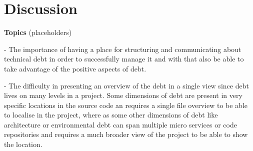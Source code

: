 

\section{Discussion}

\textbf{Topics} (placeholders)

- The importance of having a place for structuring and communicating about technical debt in order to successfully manage it and with that also be able to take advantage of the positive aspects of debt.

- The difficulty in presenting an overview of the debt in a single view since debt lives on many levels in a project. Some dimensions of debt are present in very specific locations in the source code an requires a single file overview to be able to localise in the project, where as some other dimensions of debt like architecture or environmental debt can span multiple micro services or code repositories and requires a much broader view of the project to be able to show the location.